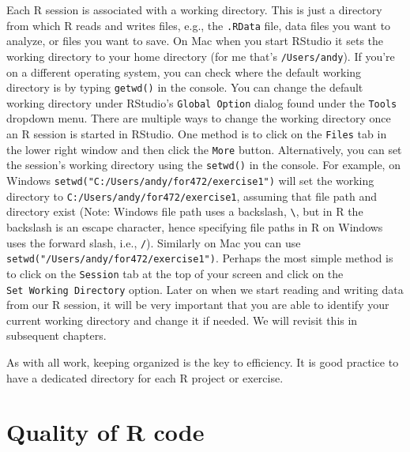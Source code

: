 \documentclass[]{krantz}
\theoremstyle{definition}
\theoremstyle{definition}
\theoremstyle{definition}
\theoremstyle{remark}
\begin{document}
Each R session is associated with a working directory. This is just a
directory from which R reads and writes files, e.g., the \texttt{.RData}
file, data files you want to analyze, or files you want to save. On Mac
when you start RStudio it sets the working directory to your home
directory (for me that's \texttt{/Users/andy}). If you're on a different
operating system, you can check where the default working directory is
by typing \texttt{getwd()} in the console. You can change the default
working directory under RStudio's \texttt{Global\ Option} dialog found
under the \texttt{Tools} dropdown menu. There are multiple ways to
change the working directory once an R session is started in RStudio.
One method is to click on the \texttt{Files} tab in the lower right
window and then click the \texttt{More} button. Alternatively, you can
set the session's working directory using the \texttt{setwd()} in the
console. For example, on Windows
\texttt{setwd("C:/Users/andy/for472/exercise1")} will set the working
directory to \texttt{C:/Users/andy/for472/exercise1}, assuming that file
path and directory exist (Note: Windows file path uses a backslash,
\texttt{\textbackslash{}}, but in R the backslash is an escape
character, hence specifying file paths in R on Windows uses the forward
slash, i.e., \texttt{/}). Similarly on Mac you can use
\texttt{setwd("/Users/andy/for472/exercise1")}. Perhaps the most simple
method is to click on the \texttt{Session} tab at the top of your screen
and click on the \texttt{Set\ Working\ Directory} option. Later on when
we start reading and writing data from our R session, it will be very
important that you are able to identify your current working directory
and change it if needed. We will revisit this in subsequent chapters.

As with all work, keeping organized is the key to efficiency. It is good
practice to have a dedicated directory for each R project or exercise.

\section{Quality of R code}\label{quality-of-r-code}
\end{document}
